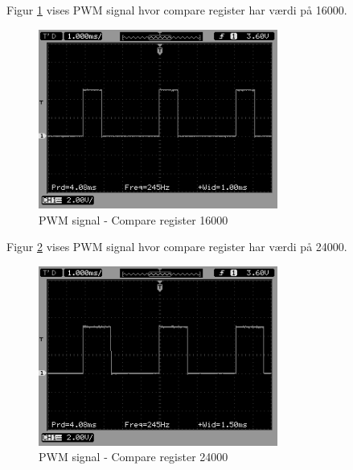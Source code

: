 Figur \ref{fig:PWM_1} vises PWM signal hvor compare register har værdi på 16000. 

\begin{figure}[H]
\centering
\includegraphics[width=0.7\textwidth]{Billeder/Test/PWM_16000.png}
\vspace{-0.0cm}
\caption{PWM signal - Compare register 16000}
\label{fig:PWM_1}
\end{figure}

\newpage

Figur \ref{fig:PWM_2} vises PWM signal hvor compare register har værdi på 24000. 
\begin{figure}[H]
\centering
\includegraphics[width=0.7\textwidth]{Billeder/Test/PWM_24000.png}

\caption{PWM signal - Compare register 24000}
\label{fig:PWM_2}
\end{figure}

\vspace{0.5cm}

